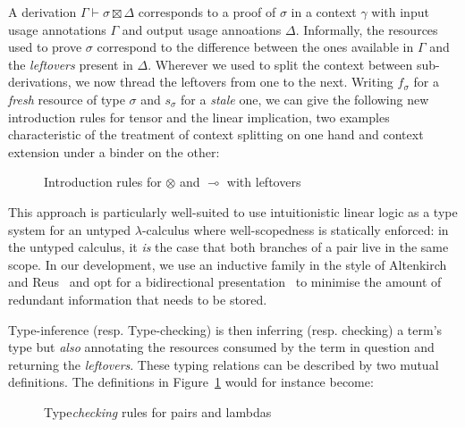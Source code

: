 \documentclass[a4paper]{easychair}
\begin{document}
A derivation $Γ ⊢ σ ⊠ Δ$ corresponds to a proof of $σ$ in a context $γ$
with input usage annotations $Γ$ and output usage annoations $Δ$.
Informally, the resources used to prove $σ$ correspond to the difference
between the ones available in $Γ$ and the \emph{leftovers} present in $Δ$.
Wherever we used to split the context between sub-derivations, we now
thread the leftovers from one to the next. Writing $f_{σ}$ for a
\emph{fresh} resource of type $σ$ and $s_{σ}$ for a \emph{stale} one,
we can give the following new introduction rules for tensor and the
linear implication, two examples characteristic of the treatment of
context splitting on one hand and context extension under a binder
on the other:

\begin{figure}[ht]
\caption{Introduction rules for $⊗$ and $⊸$ with leftovers\label{rules:leftovers}}
\end{figure}

This approach is particularly well-suited to use intuitionistic linear
logic as a type system for an untyped $λ$-calculus where well-scopedness
is statically enforced: in the untyped calculus, it \emph{is} the case
that both branches of a pair live in the same scope. In our development,
we use an inductive family in the style of Altenkirch and Reus~\cite{Altenkirch1999}
and opt for a bidirectional presentation~\cite{Pierce:2000:LTI:345099.345100}
to minimise the amount of redundant information that needs to be stored.

Type-inference (resp. Type-checking) is then inferring (resp. checking)
a term's type but \emph{also} annotating the resources consumed by the
term in question and returning the \emph{leftovers}. These typing
relations can be described by two mutual definitions. The definitions in
Figure~\ref{rules:leftovers} would for instance become:

\begin{figure}[ht]
\caption{Type\emph{checking} rules for pairs and lambdas\label{rules:checking}}
\end{figure}
\end{document}
